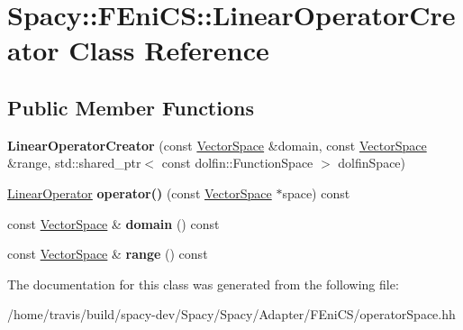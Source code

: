 \hypertarget{classSpacy_1_1FEniCS_1_1LinearOperatorCreator}{\section{Spacy\-:\-:F\-Eni\-C\-S\-:\-:Linear\-Operator\-Creator Class Reference}
\label{classSpacy_1_1FEniCS_1_1LinearOperatorCreator}
}
\subsection*{Public Member Functions}
\begin{DoxyCompactItemize}
\item 
\hypertarget{classSpacy_1_1FEniCS_1_1LinearOperatorCreator_ac95b6324d13993c0a8e2393a4521e14b}{{\bfseries Linear\-Operator\-Creator} (const \hyperlink{classSpacy_1_1VectorSpace}{Vector\-Space} \&domain, const \hyperlink{classSpacy_1_1VectorSpace}{Vector\-Space} \&range, std\-::shared\-\_\-ptr$<$ const dolfin\-::\-Function\-Space $>$ dolfin\-Space)}\label{classSpacy_1_1FEniCS_1_1LinearOperatorCreator_ac95b6324d13993c0a8e2393a4521e14b}

\item 
\hypertarget{classSpacy_1_1FEniCS_1_1LinearOperatorCreator_a2ef756542e2bab847054dc90726d1f50}{\hyperlink{classSpacy_1_1FEniCS_1_1LinearOperator}{Linear\-Operator} {\bfseries operator()} (const \hyperlink{classSpacy_1_1VectorSpace}{Vector\-Space} $\ast$space) const }\label{classSpacy_1_1FEniCS_1_1LinearOperatorCreator_a2ef756542e2bab847054dc90726d1f50}

\item 
\hypertarget{classSpacy_1_1FEniCS_1_1LinearOperatorCreator_a0eab2a20a95036e44e44dee2c64b3b26}{const \hyperlink{classSpacy_1_1VectorSpace}{Vector\-Space} \& {\bfseries domain} () const }\label{classSpacy_1_1FEniCS_1_1LinearOperatorCreator_a0eab2a20a95036e44e44dee2c64b3b26}

\item 
\hypertarget{classSpacy_1_1FEniCS_1_1LinearOperatorCreator_a9a26a81885dfe279565f48cee5fb43ed}{const \hyperlink{classSpacy_1_1VectorSpace}{Vector\-Space} \& {\bfseries range} () const }\label{classSpacy_1_1FEniCS_1_1LinearOperatorCreator_a9a26a81885dfe279565f48cee5fb43ed}

\end{DoxyCompactItemize}


The documentation for this class was generated from the following file\-:\begin{DoxyCompactItemize}
\item 
/home/travis/build/spacy-\/dev/\-Spacy/\-Spacy/\-Adapter/\-F\-Eni\-C\-S/operator\-Space.\-hh\end{DoxyCompactItemize}
